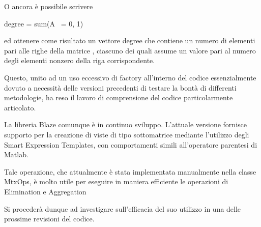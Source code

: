 O ancora è possibile scrivere
\begin{codice}
degree = sum(A ~= 0, 1)
\end{codice}
ed ottenere come risultato un vettore degree che contiene un numero di elementi pari alle righe della matrice , ciascuno dei quali assume un valore pari al numero degli elementi nonzero della riga corrispondente.

Questo, unito ad un uso eccessivo di factory all'interno del codice essenzialmente dovuto a necessità delle versioni precedenti di testare la bontà di differenti metodologie, ha reso il lavoro di comprensione del codice particolarmente articolato.

La libreria Blaze comunque è in continuo sviluppo. 
L'attuale versione fornisce supporto per la creazione di viste di tipo sottomatrice mediante l'utilizzo degli Smart Expression Templates, con comportamenti simili all'operatore parentesi di Matlab.

Tale operazione, che attualmente è stata implementata manualmente nella classe MtxOps, è molto utile per eseguire in maniera efficiente le operazioni di Elimination e Aggregation

Si procederà dunque ad investigare sull'efficacia del suo utilizzo in una delle prossime revisioni del codice.